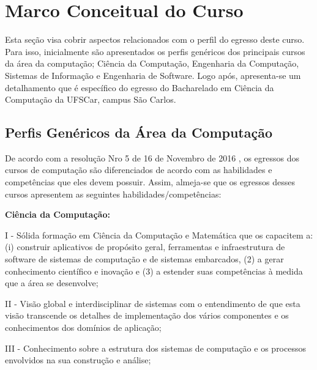 \chapter{Marco Conceitual do Curso}\label{sec:marco_conceitual}


Esta seção visa cobrir aspectos relacionados com o perfil do egresso deste curso. Para isso, inicialmente são apresentados os perfis genéricos dos principais cursos da área da computação; Ciência da Computação, Engenharia da Computação, Sistemas de Informação e Engenharia de Software. Logo após, apresenta-se um detalhamento que é específico do egresso do Bacharelado em Ciência da Computação da UFSCar, campus São Carlos.

\section{Perfis Genéricos da Área da Computação}

De acordo com a resolução Nro 5 de 16 de Novembro de 2016 \cite{SBC-Diretrizes}, os egressos dos cursos de computação são diferenciados de acordo com as habilidades e competências que eles devem possuir. Assim, almeja-se que os egressos desses cursos apresentem as seguintes habilidades/competências:

\textbf{Ciência da Computação:}

I - Sólida formação em Ciência da Computação e Matemática que os capacitem a: (i) construir aplicativos de propósito geral, ferramentas e infraestrutura de
software de sistemas de computação e de sistemas embarcados, (2) a gerar conhecimento científico e inovação e (3) %
a estender suas competências à medida que a área se desenvolve;

II - Visão global e interdisciplinar de sistemas com o entendimento de que esta visão transcende os detalhes de implementação dos vários componentes e os conhecimentos dos domínios de aplicação;

III - Conhecimento sobre a estrutura dos sistemas de computação e os processos
envolvidos na sua construção e análise;

